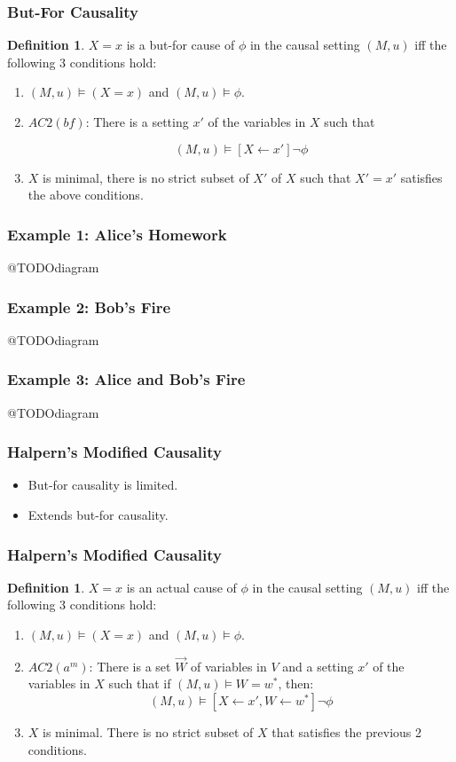 \documentclass{beamer}
\theoremstyle{plain}
\theoremstyle{definition}
\newtheorem{defn}[thm]{Definition} %
\begin{document}
\begin{frame}
\frametitle{But-For Causality}

\begin{defn}$X=x$ is a but-for cause of $\phi$ in the causal setting $(M,u)$ iff the following 3 conditions hold:
\begin{enumerate}
\item $(M,u) \models (X=x)$ and $(M,u) \models \phi$.
\item $AC2(bf)$: There is a setting $x'$ of the variables in $X$ such that

\[
(M,u) \models [X\leftarrow x']\lnot \phi
\] 

\item $X$ is minimal, there is no strict subset of $X'$ of $X$ such that $X' = x'$ satisfies the above conditions.
\end{enumerate}

\end{defn}

\end{frame}


\begin{frame}
\frametitle{Example 1: Alice's Homework}
@TODOdiagram
\end{frame}


\begin{frame}
\frametitle{Example 2: Bob's Fire}
@TODOdiagram
\end{frame}


\begin{frame}
\frametitle{Example 3: Alice and Bob's Fire}
@TODOdiagram
\end{frame}





\begin{frame}
\frametitle{Halpern's Modified Causality}
\begin{itemize}
\item But-for causality is limited.
\item Extends but-for causality.
\end{itemize}

\end{frame}

\begin{frame}
\frametitle{Halpern's Modified Causality}
\begin{defn}$X=x$ is an actual cause of $\phi$ in the causal setting $(M,u)$ iff the following 3 conditions hold:
\begin{enumerate}
\item $(M,u) \models (X=x)$ and $(M,u) \models \phi$.
\item $AC2(a^m)$: There is a set $\vec{W}$ of variables in $V$ and a setting $x'$ of the variables in $X$ such that if $(M,u) \models W = w^*$, then:
\[
(M,u) \models [X \leftarrow x', W \leftarrow w^*] \neg \phi
\]
\item $X$ is minimal. There is no strict subset of $X$ that satisfies the previous 2 conditions.
\end{enumerate}

\end{defn}
\end{frame}
\end{document}
